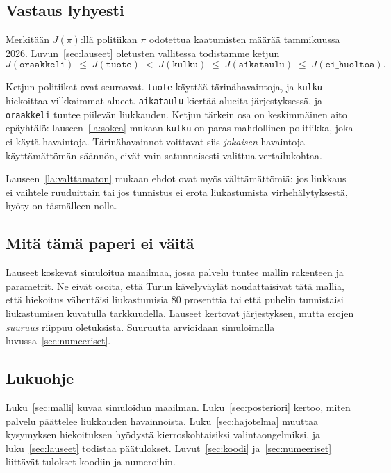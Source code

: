 \documentclass[11pt,a4paper]{article}
\theoremstyle{plain}
\theoremstyle{definition}
\theoremstyle{remark}
\newcommand{\1}{\mathbf{1}}
\newcommand{\pol}[1]{\texttt{#1}}
\begin{document}
\subsection{Vastaus lyhyesti}

Merkitään $J(\pi)$:llä politiikan $\pi$ odotettua kaatumisten määrää
tammikuussa 2026. Luvun~\ref{sec:lauseet} oletusten vallitessa todistamme ketjun
\begin{equation*}
  J(\pol{oraakkeli}) \;\le\; J(\pol{tuote}) \;<\; J(\pol{kulku})
  \;\le\; J(\pol{aikataulu}) \;\le\; J(\pol{ei\_huoltoa}).
\end{equation*}

Ketjun politiikat ovat seuraavat. \pol{tuote} käyttää tärinähavaintoja, ja
\pol{kulku} hiekoittaa vilkkaimmat alueet. \pol{aikataulu} kiertää alueita
järjestyksessä, ja \pol{oraakkeli} tuntee piilevän liukkauden. Ketjun tärkein
osa on keskimmäinen aito epäyhtälö: lauseen~\ref{la:sokea} mukaan \pol{kulku} on
paras mahdollinen politiikka, joka ei käytä havaintoja. Tärinähavainnot
voittavat siis \emph{jokaisen} havaintoja käyttämättömän säännön, eivät vain
satunnaisesti valittua vertailukohtaa.

Lauseen~\ref{la:valttamaton} mukaan ehdot ovat myös välttämättömiä: jos
liukkaus ei vaihtele ruuduittain tai jos tunnistus ei erota liukastumista
virhehälytyksestä, hyöty on täsmälleen nolla.

\subsection{Mitä tämä paperi ei väitä}

Lauseet koskevat simuloitua maailmaa, jossa palvelu tuntee mallin rakenteen ja
parametrit. Ne eivät osoita, että Turun kävelyväylät noudattaisivat tätä mallia,
että hiekoitus vähentäisi liukastumisia 80 prosenttia tai että puhelin
tunnistaisi liukastumisen kuvatulla tarkkuudella. Lauseet kertovat
järjestyksen, mutta erojen \emph{suuruus} riippuu oletuksista. Suuruutta
arvioidaan simuloimalla luvussa~\ref{sec:numeeriset}.

\subsection{Lukuohje}

Luku~\ref{sec:malli} kuvaa simuloidun maailman. Luku~\ref{sec:posteriori}
kertoo, miten palvelu päättelee liukkauden havainnoista. Luku~\ref{sec:hajotelma}
muuttaa kysymyksen hiekoituksen hyödystä kierroskohtaisiksi valintaongelmiksi,
ja luku~\ref{sec:lauseet} todistaa päätulokset. Luvut~\ref{sec:koodi}
ja~\ref{sec:numeeriset} liittävät tulokset koodiin ja numeroihin.
\end{document}

